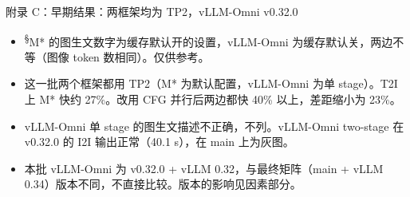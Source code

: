 \begin{frame}[t]{附录 C：早期结果：两框架均为 TP2，vLLM-Omni v0.32.0}
\scriptsize\def\codesize{\relax}
\renewcommand{\arraystretch}{1.12}\setlength{\tabcolsep}{3pt}

\vspace{4pt}
\begin{itemize}\scriptsize\setlength\itemsep{1pt}
  \item \textsuperscript{§}M* 的图生文数字为缓存默认开的设置，vLLM-Omni 为缓存默认关，两边不等（图像 token 数相同）。仅供参考。
  \item 这一批两个框架都用 TP2（M* 为默认配置，vLLM-Omni 为单 stage）。T2I 上 M* 快约 27\%。改用 CFG 并行后两边都快 40\% 以上，差距缩小为 23\%。
  \item vLLM-Omni 单 stage 的图生文描述不正确，不列。vLLM-Omni two-stage 在 v0.32.0 的 I2I 输出正常（40.1 s），在 main 上为灰图。
  \item 本批 vLLM-Omni 为 v0.32.0 + vLLM 0.32，与最终矩阵（main + vLLM 0.34）版本不同，不直接比较。版本的影响见因素部分。
\end{itemize}
\end{frame}

